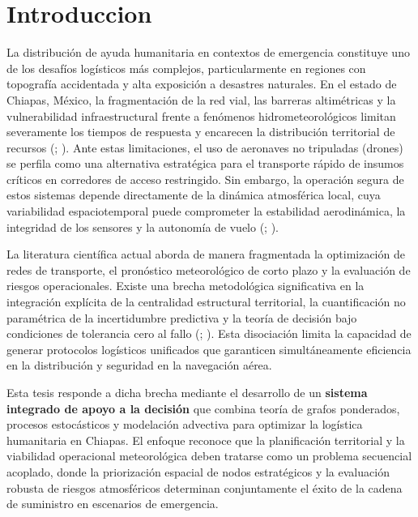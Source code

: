 \documentclass[
  spanish,
  us-letterpaper,
]{scrreprt}
\numberwithin{equation}{section}
\begin{document}

\chapter{Introduccion}\label{introduccion}

La distribución de ayuda humanitaria en contextos de emergencia
constituye uno de los desafíos logísticos más complejos, particularmente
en regiones con topografía accidentada y alta exposición a desastres
naturales. En el estado de Chiapas, México, la fragmentación de la red
vial, las barreras altimétricas y la vulnerabilidad infraestructural
frente a fenómenos hidrometeorológicos limitan severamente los tiempos
de respuesta y encarecen la distribución territorial de recursos
(;
). Ante estas
limitaciones, el uso de aeronaves no tripuladas (drones) se perfila como
una alternativa estratégica para el transporte rápido de insumos
críticos en corredores de acceso restringido. Sin embargo, la operación
segura de estos sistemas depende directamente de la dinámica atmosférica
local, cuya variabilidad espaciotemporal puede comprometer la
estabilidad aerodinámica, la integridad de los sensores y la autonomía
de vuelo (; ).

La literatura científica actual aborda de manera fragmentada la
optimización de redes de transporte, el pronóstico meteorológico de
corto plazo y la evaluación de riesgos operacionales. Existe una brecha
metodológica significativa en la integración explícita de la centralidad
estructural territorial, la cuantificación no paramétrica de la
incertidumbre predictiva y la teoría de decisión bajo condiciones de
tolerancia cero al fallo (; ). Esta
disociación limita la capacidad de generar protocolos logísticos
unificados que garanticen simultáneamente eficiencia en la distribución
y seguridad en la navegación aérea.

Esta tesis responde a dicha brecha mediante el desarrollo de un
\textbf{sistema integrado de apoyo a la decisión} que combina teoría de
grafos ponderados, procesos estocásticos y modelación advectiva para
optimizar la logística humanitaria en Chiapas. El enfoque reconoce que
la planificación territorial y la viabilidad operacional meteorológica
deben tratarse como un problema secuencial acoplado, donde la
priorización espacial de nodos estratégicos y la evaluación robusta de
riesgos atmosféricos determinan conjuntamente el éxito de la cadena de
suministro en escenarios de emergencia.
\end{document}
